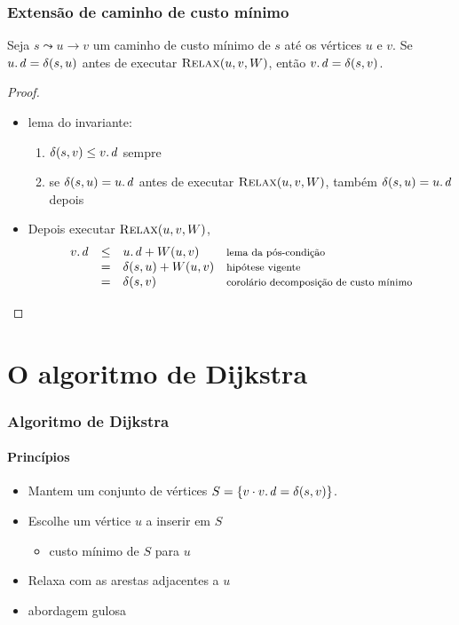 \documentclass{beamer}
\begin{document}
\begin{frame}
\frametitle{Extensão de caminho de custo mínimo}

\begin{lemma}
Seja $s \leadsto u \rightarrow v$ um caminho de custo mínimo de $s$ até os
vértices $u$ e $v$. Se $\attrib{u}{d} = \delta(s, u)$ antes de executar
$\textnormal{\scshape Relax}(u, v, W)$, então $\attrib{v}{d} = \delta(s, v)$.
\end{lemma}

\begin{proof}
\begin{itemize}
\item lema do invariante: 
\begin{enumerate}
\item $\delta(s, v) \le \attrib{v}{d}$ sempre
\item se $\delta(s, u) = \attrib{u}{d}$ antes de executar $\textnormal{\scshape Relax}(u, v, W)$, também
$\delta(s, u) = \attrib{u}{d}$ depois
\end{enumerate}
\item Depois executar $\textnormal{\scshape Relax}(u, v, W)$,
$$
\begin{array}{rcll}
\attrib{v}{d} & \le & \attrib{u}{d} + W(u, v)  & \text{\footnotesize lema da pós-condição} \\
& = & \delta(s, u) + W(u, v) & \text{\footnotesize hipótese vigente} \\
& = & \delta(s, v) & \text{\footnotesize corolário decomposição de custo mínimo}
\end{array}
$$
\end{itemize}
\end{proof}
\end{frame}

\section{O algoritmo de Dijkstra}

\begin{frame}
\frametitle{Algoritmo de Dijkstra}
\framesubtitle{Princípios}

\begin{itemize}
\item Mantem um conjunto de vértices $S = \{ v \cdot \attrib{v}{d} = \delta(s, v)\}$.
\item Escolhe um vértice $u$ a inserir em $S$
\begin{itemize}
\item custo mínimo de $S$ para $u$
\end{itemize}
\item Relaxa com as arestas adjacentes a $u$
\item abordagem \alert{gulosa}
\end{itemize}

\end{frame}
\end{document}
